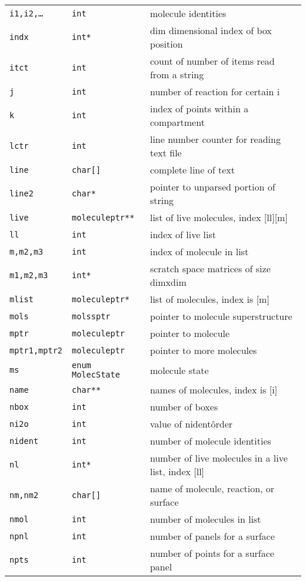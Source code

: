 \documentclass {book}
\newcommand {\ttt} {\texttt}
\begin{document}
\begin{longtable}[c]{lll}
\ttt{i1,i2,\ldots} & \ttt{int} & molecule identities\\
\ttt{indx} & \ttt{int*} & dim dimensional index of box position\\
\ttt{itct} & \ttt{int} & count of number of items read from a string\\
\ttt{j} & \ttt{int} & number of reaction for certain i\\
\ttt{k} & \ttt{int} & index of points within a compartment\\
\ttt{lctr} & \ttt{int} & line number counter for reading text file\\
\ttt{line} & \ttt{char[]} & complete line of text\\
\ttt{line2} & \ttt{char*} & pointer to unparsed portion of string\\
\ttt{live} & \ttt{moleculeptr**} & list of live molecules, index [ll][m]\\
\ttt{ll} & \ttt{int} & index of live list\\
\ttt{m,m2,m3} & \ttt{int} & index of molecule in list\\
\ttt{m1,m2,m3} & \ttt{int*} & scratch space matrices of size dimxdim\\
\ttt{mlist} & \ttt{moleculeptr*} & list of molecules, index is [m]\\
\ttt{mols} & \ttt{molssptr} & pointer to molecule superstructure\\
\ttt{mptr} & \ttt{moleculeptr} & pointer to molecule\\
\ttt{mptr1,mptr2} & \ttt{moleculeptr} & pointer to more molecules\\
\ttt{ms} & \ttt{enum MolecState} & molecule state\\
\ttt{name} & \ttt{char**} & names of molecules, index is [i]\\
\ttt{nbox} & \ttt{int} & number of boxes\\
\ttt{ni2o} & \ttt{int} & value of nident\^order\\
\ttt{nident} & \ttt{int} & number of molecule identities\\
\ttt{nl} & \ttt{int*} & number of live molecules in a live list, index [ll]\\
\ttt{nm,nm2} & \ttt{char[]} & name of molecule, reaction, or surface\\
\ttt{nmol} & \ttt{int} & number of molecules in list\\
\ttt{npnl} & \ttt{int} & number of panels for a surface\\
\ttt{npts} & \ttt{int} & number of points for a surface panel\\

\end{longtable}
\end{document}
